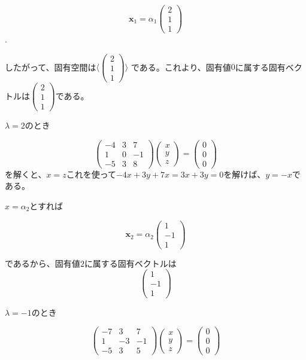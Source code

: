 \documentclass[dvipdfmx,autodetect-engine]{jsarticle}
\theoremstyle{definition}
\begin{document}
{$$
\bm{x}_1 = \alpha_1 \begin{pmatrix}
2 \\
1 \\
1
\end{pmatrix}
$$.

したがって、固有空間は$\langle \begin{pmatrix}
2 \\
1 \\
1
\end{pmatrix} \rangle$ である。これより、固有値$0$に属する固有ベクトルは$\begin{pmatrix}
2 \\
1 \\
1
\end{pmatrix}$である。

$\lambda = 2$のとき

$$
\begin{pmatrix}
-4 & 3 & 7 \\
1 & 0 & -1 \\
-5 & 3 & 8
\end{pmatrix}\begin{pmatrix}
x \\
y \\
z
\end{pmatrix} = \begin{pmatrix}
0 \\
0 \\
0
\end{pmatrix}
$$を解くと、$x = z$これを使って$-4x + 3y + 7x = 3x + 3y = 0$を解けば、$y = -x$である。

$x = \alpha_2$とすれば

$$
\bm{x}_2 = \alpha_2 \begin{pmatrix}
1　\\
-1 \\
1
\end{pmatrix}
$$

であるから、固有値$2$に属する固有ベクトルは
$$\begin{pmatrix}
1　\\
-1 \\
1
\end{pmatrix}$$

$\lambda = -1$のとき

$$
\begin{pmatrix}
-7 & 3 & 7 \\
1 & -3 & -1 \\
-5 & 3 & 5
\end{pmatrix}\begin{pmatrix}
x \\
y \\
z
\end{pmatrix} = \begin{pmatrix}
0 \\
0 \\
0
\end{pmatrix}
$$

}
\end{document}
